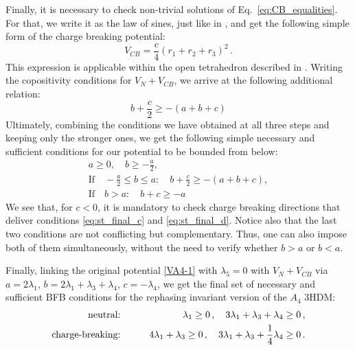 \documentclass[11pt]{article}
\begin{document}
Finally, it is necessary to check non-trivial solutions of Eq.~\eqref{eq:CB_equalities}.
For that, we write it as the law of sines, just like in \cite{Faro:2019vcd}, and get the following simple form of the charge breaking potential:
\begin{equation}
    V_{CB} = \frac{c}{4}\left(r_1+r_2+r_3\right)^2\,.
\end{equation}
This expression is applicable within the open tetrahedron described in \cite{Faro:2019vcd}. 
Writing the copositivity conditions for $V_N + V_{CB}$, we arrive at the following additional relation:
\begin{equation}
b+\frac{c}{2}\geq -(a+b+c) \label{eq:st_3}
\end{equation}
Ultimately, combining the conditions we have obtained at all three steps and keeping only the stronger ones, 
we get the following simple necessary and sufficient conditions for our potential to be bounded from below:
\begin{align}
a \geq 0,\quad
b \geq - \frac{a}{2} \label{eq:st_final_b},\\
\textrm{If} \quad -\frac{a}{2}\leq b \leq a: \quad b+\frac{c}{2}\geq -(a+b+c) \label{eq:st_final_c},\\
\textrm{If} \quad b > a: \quad b + c\geq -a \label{eq:st_final_d}
\end{align}
We see that, for $c < 0$, it is mandatory to check charge breaking directions that deliver conditions \eqref{eq:st_final_c} and \eqref{eq:st_final_d}. 
Notice also that the last two conditions are not conflicting but complementary. Thus, one can also impose both of them simultaneously,
without the need to verify whether $b> a$ or $b < a$.

Finally, linking the original potential \eqref{VA4-1} with $\lambda_5=0$ with $V_N+V_{CB}$ via 
$a = 2\lambda_1$, $b = 2\lambda_1 + \lambda_3 + \lambda_4$, $c = - \lambda_4$, 
we get the final set of necessary and sufficient BFB conditions for the rephasing invariant version of the $A_4$ 3HDM:
\begin{eqnarray}
\mbox{neutral:}&\qquad& \lambda_1 \ge 0\,, \quad
3\lambda_1 + \lambda_3 + \lambda_4 \ge 0\,, \label{final-U1U1-neutral-app}\\
\mbox{charge-breaking:}&\qquad& 4\lambda_1 + \lambda_3 \ge 0\,, \quad
3\lambda_1 + \lambda_3 + {1\over 4}\lambda_4 \ge 0\,.\label{final-U1U1-CB-app}
\end{eqnarray}


\end{document}
